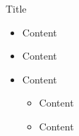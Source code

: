 \begin{frame}{Title}
  \begin{itemize}
    \item Content
    \vspace{\baselineskip}
    \item Content
    \vspace{\baselineskip}
    \item Content
    \begin{itemize}
       \item Content
       \item Content
     \end{itemize}
  \end{itemize}
\end{frame}
